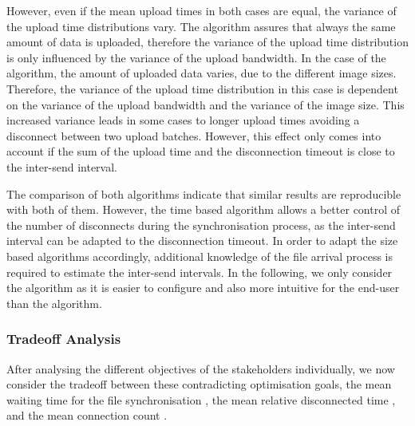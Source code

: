 However, even if the mean upload times in both cases are equal, the variance of the upload time distributions vary.
The \algosize algorithm assures that always the same amount of data is uploaded, therefore the variance of the upload time distribution is only influenced by the variance of the upload bandwidth.
In the case of the \algointerval algorithm, the amount of uploaded data varies, due to the different image sizes.
Therefore, the variance of the upload time distribution in this case is dependent on the variance of the upload bandwidth and the variance of the image size.
This increased variance leads in some cases to longer upload times avoiding a disconnect between two upload batches.
However, this effect only comes into account if the sum of the upload time and the disconnection timeout is close to the inter-send interval.

The comparison of both algorithms indicate that similar results are reproducible with both of them.
However, the time based algorithm allows a better control of the number of disconnects during the synchronisation process, as the inter-send interval can be adapted to the disconnection timeout. 
In order to adapt the size based algorithms accordingly, additional knowledge of the file arrival process is required to estimate the inter-send intervals.
In the following, we only consider the \algointerval algorithm as it is easier to configure and also more intuitive for the end-user than the \algosize algorithm. 

\subsubsection*{Tradeoff Analysis}\label{sec:application:cloud_file_synchronisation:numerical_evaluation:trade_off_analysis}

After analysing the different objectives of the stakeholders individually, we now consider the tradeoff between these contradicting optimisation goals, the mean waiting time for the file synchronisation \sojournTime, the mean relative disconnected time \relativeDisconnectedTime, and the mean connection count \connectionCount.

